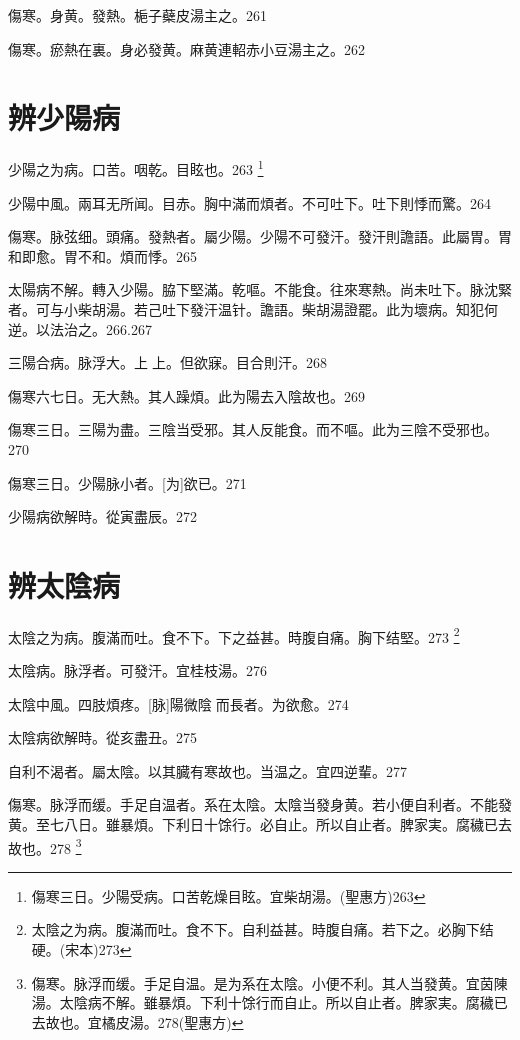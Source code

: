 \documentclass[11pt,oneside,b5paper]{ctexbook}
\begin{document}
\begin{flushleft}
傷寒。身黄。發熱。梔子蘗皮湯主之。261

傷寒。瘀熱在裏。身必發黄。麻黄連軺赤小豆湯主之。262

\chapter{辨少陽病}

少陽之为病。口苦。咽乾。目眩也。263
\footnote{傷寒三日。少陽受病。口苦乾燥目眩。宜柴胡湯。(聖惠方)263}

少陽中風。兩耳无所闻。目赤。胸中滿而煩者。不可吐下。吐下則悸而驚。264

傷寒。脉弦细。頭痛。發熱者。屬少陽。少陽不可發汗。發汗則譫語。此屬胃。胃和即愈。胃不和。煩而悸。265

太陽病不解。轉入少陽。脇下堅滿。乾嘔。不能食。往來寒熱。尚未吐下。脉沈緊者。可与小柴胡湯。若己吐下發汗温针。譫語。柴胡湯證罷。此为壞病。知犯何逆。以法治之。266.267

三陽合病。脉浮大。上{𬮦}上。但欲寐。目合則汗。268

傷寒六七日。无大熱。其人躁煩。此为陽去入陰故也。269

傷寒三日。三陽为盡。三陰当受邪。其人反能食。而不嘔。此为三陰不受邪也。270

傷寒三日。少陽脉小者。[为]欲已。271

少陽病欲解時。從寅盡辰。272

\chapter{辨太陰病}

太陰之为病。腹滿而吐。食不下。下之益甚。時腹自痛。胸下结堅。273
\footnote{太陰之为病。腹滿而吐。食不下。自利益甚。時腹自痛。若下之。必胸下结硬。(宋本)273}

太陰病。脉浮者。可發汗。宜桂枝湯。276

太陰中風。四肢煩疼。[脉]陽微陰{𬈧}而長者。为欲愈。274

太陰病欲解時。從亥盡丑。275

自利不渴者。屬太陰。以其臓有寒故也。当温之。宜四逆輩。277

傷寒。脉浮而缓。手足自温者。系在太陰。太陰当發身黄。若小便自利者。不能發黄。至七八日。雖暴煩。下利日十馀行。必自止。所以自止者。脾家実。腐穢已去故也。278
\footnote{傷寒。脉浮而缓。手足自温。是为系在太陰。小便不利。其人当發黄。宜茵陳湯。太陰病不解。雖暴煩。下利十馀行而自止。所以自止者。脾家実。腐穢已去故也。宜橘皮湯。278(聖惠方)}


\end{flushleft}
\end{document}
